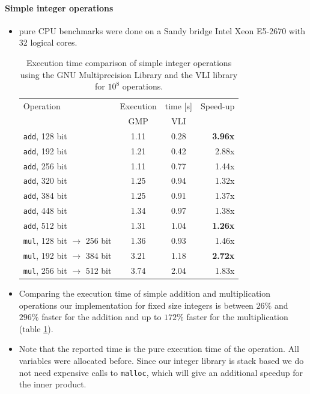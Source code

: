 \documentclass[oribibl,a4paper]{llncs2e/llncs}
\begin{document}
\paragraph{Simple integer operations}
\begin{itemize}
\item pure CPU benchmarks were done on a Sandy bridge Intel Xeon E5-2670 with 32 logical cores.
\begin{table}
   \centering
   \begin{tabular}{l|cc|r}
    Operation & Execution & time [s] & Speed-up\\
      & GMP & VLI & \\
    \hline
   \verb|add|, 128 bit & 1.11 & 0.28 & {\bf 3.96x} \\
   \verb|add|, 192 bit & 1.21 & 0.42 & 2.88x \\
   \verb|add|, 256 bit & 1.11 & 0.77 & 1.44x \\
   \verb|add|, 320 bit & 1.25 & 0.94 & 1.32x \\
   \verb|add|, 384 bit & 1.25 & 0.91 & 1.37x \\
   \verb|add|, 448 bit & 1.34 & 0.97 & 1.38x \\
   \verb|add|, 512 bit & 1.31 & 1.04 & {\bf 1.26x} \\
   \hline
   \verb|mul|, 128 bit $\rightarrow$ 256 bit & 1.36 & 0.93 & 1.46x \\
   \verb|mul|, 192 bit $\rightarrow$ 384 bit & 3.21 & 1.18 & {\bf 2.72x} \\
   \verb|mul|, 256 bit $\rightarrow$ 512 bit & 3.74 & 2.04 & 1.83x \\ 
   \end{tabular}
   \caption{Execution time comparison of simple integer operations using the GNU Multiprecision Library and the VLI library for $10^8$ operations.}
   \label{tab:vli_vs_gmp}
\end{table}


\item Comparing the execution time of simple addition and multiplication operations our implementation for fixed size integers is between $26\%$ and $296\%$ faster for the addition and up to $172\%$ faster for the multiplication (table \ref{tab:vli_vs_gmp}).
\item Note that the reported time is the pure execution time of the operation. All variables were allocated before.
Since our integer library is stack based we do not need expensive calls to \verb|malloc|, which will give an additional speedup for the inner product.
\end{itemize}
\end{document}
